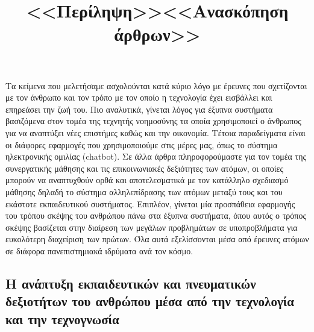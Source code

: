 \documentclass[12pt]{article}
\begin{document}
\newpage
\begin{center}\LARGE{\title{\textbf{<<Περίληψη>>}}}\end{center}
\begin{abstract*}
    Τα κείμενα που μελετήσαμε ασχολούνται κατά κύριο λόγο με έρευνες που σχετίζονται με τον άνθρωπο και τον τρόπο με τον οποίο η τεχνολογία έχει εισβάλλει και επηρεάσει την ζωή του. Πιο αναλυτικά, γίνεται λόγος για έξυπνα συστήματα βασιζόμενα στον τομέα της τεχνητής νοημοσύνης τα οποία χρησιμοποιεί ο άνθρωπος για να αναπτύξει νέες επιστήμες καθώς και την οικονομία. Τέτοια παραδείγματα είναι οι διάφορες εφαρμογές που χρησιμοποιούμε στις μέρες μας, όπως το σύστημα ηλεκτρονικής ομιλίας (chatbot). Σε άλλα άρθρα πληροφορούμαστε για τον τομέα της συνεργατικής μάθησης και τις επικοινωνιακές δεξιότητες των ατόμων, οι οποίες μπορούν να αναπτυχθούν ορθά και αποτελεσματικά με τον κατάλληλο σχεδιασμό μάθησης δηλαδή το σύστημα αλληλεπίδρασης των ατόμων μεταξύ τους και του εκάστοτε εκπαιδευτικού συστήματος. Επιπλέον, γίνεται μία προσπάθεια εφαρμογής του τρόπου σκέψης του ανθρώπου πάνω στα έξυπνα συστήματα, όπου αυτός ο τρόπος σκέψης βασίζεται στην διαίρεση των μεγάλων προβλημάτων σε υποπροβλήματα για ευκολότερη διαχείριση των πρώτων. Όλα αυτά εξελίσσονται μέσα από έρευνες ατόμων σε διάφορα πανεπιστημιακά ιδρύματα ανά τον κόσμο.
\end{abstract*}


\newpage
\begin{center}\LARGE{\title{\textbf{<<Ανασκόπηση άρθρων>>}}}\end{center}
\maketitle
\begin{center}\section*{Η ανάπτυξη  εκπαιδευτικών και πνευματικών δεξιοτήτων του ανθρώπου μέσα από την τεχνολογία και την τεχνογνωσία}\end{center}
\end{document}
